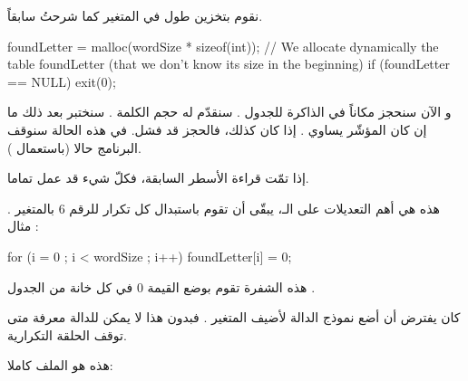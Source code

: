 نقوم بتخزين طول
في المتغير
كما شرحتُ سابقاً.

\begin{Csource}
foundLetter = malloc(wordSize  * sizeof(int)); // We allocate dynamically the table foundLetter (that we don't know its size in the beginning)
if (foundLetter  == NULL)
	 exit(0);
\end{Csource}

و الآن سنحجز مكاناً في الذاكرة للجدول
.
سنقدّم له حجم الكلمة
.
سنختبر بعد ذلك ما إن كان المؤشّر يساوي
.
إذا كان كذلك، فالحجز قد فشل. في هذه الحالة سنوقف البرنامج حالا (باستعمال
).

إذا تمّت قراءة الأسطر السابقة، فكلّ شيء قد عمل تماما.

هذه هي أهم التعديلات على الـ،
يبقّى أن تقوم باستبدال كل تكرار للرقم 6 بالمتغير
.
مثال :

\begin{Csource}
for (i = 0 ; i < wordSize ; i++)
 	foundLetter[i] = 0;
\end{Csource}

هذه الشفرة تقوم بوضع القيمة 0 في كل خانة من الجدول
.

كان يفترض أن أضع نموذج الدالة
لأضيف المتغير
.
فبدون هذا لا يمكن للدالة معرفة متى توقف الحلقة التكرارية.

هذه هو الملف
كاملا:

